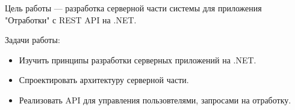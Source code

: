 \intro
Цель работы --- разработка серверной части системы для приложения "Отработки" с REST API на .NET.

Задачи работы:
\begin{itemize}
	\item{Изучить принципы разработки серверных приложений на .NET.}
	\item{Спроектировать архитектуру серверной части.}
	\item{Реализовать API для управления пользовтелями, запросами на отработку.}
\end{itemize}
